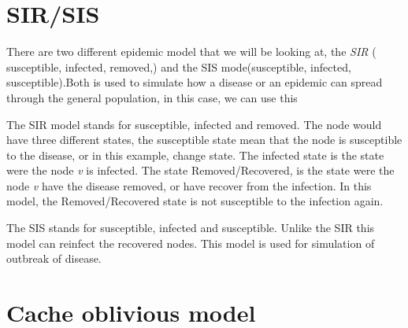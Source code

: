 \section{SIR/SIS}
There are two different epidemic model that we will be looking at, the {\it SIR} ( susceptible, infected, removed,) and the SIS mode(susceptible, infected, susceptible).Both is used to simulate how a disease or an epidemic can spread through the general population, in this case, we can use this 

The SIR model stands for susceptible, infected and removed. The node would have three different states, the susceptible state mean that the node is susceptible to the disease, or in this example, change state. The infected state is the state were the node {\it v} is infected. The state Removed/Recovered, is the state were the node {\it v} have the disease removed, or have recover from the infection. In this model, the Removed/Recovered state is not susceptible to the infection again. 

The SIS stands for susceptible, infected and susceptible. Unlike the SIR this model can reinfect the recovered nodes. This model is used for simulation of outbreak of disease. 

\section{Cache oblivious model}